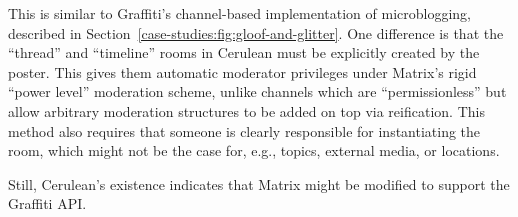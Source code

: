 

This is similar to Graffiti's channel-based implementation of microblogging, described
in Section~\ref{case-studies:fig:gloof-and-glitter}.
One difference is that the ``thread'' and ``timeline'' rooms
in Cerulean
must be explicitly created by the poster.
This gives them automatic moderator privileges
under Matrix's rigid ``power level'' moderation
scheme, unlike channels
which are ``permissionless'' but allow arbitrary
moderation structures to be added on top via
reification.
This method also requires that someone is clearly responsible for instantiating the room,
which might not be the case for, e.g., topics, external media, or locations.

Still, Cerulean's existence indicates that
Matrix might be modified to support the Graffiti API.





